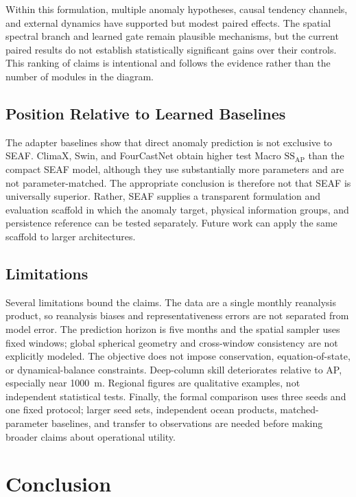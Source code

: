 \documentclass[conference]{IEEEtran}
\begin{document}
Within this formulation, multiple anomaly hypotheses, causal tendency channels, and external dynamics have supported but modest paired effects. The spatial spectral branch and learned gate remain plausible mechanisms, but the current paired results do not establish statistically significant gains over their controls. This ranking of claims is intentional and follows the evidence rather than the number of modules in the diagram.

\subsection{Position Relative to Learned Baselines}
The adapter baselines show that direct anomaly prediction is not exclusive to SEAF. ClimaX, Swin, and FourCastNet obtain higher test Macro $\mathrm{SS}_{\mathrm{AP}}$ than the compact SEAF model, although they use substantially more parameters and are not parameter-matched. The appropriate conclusion is therefore not that SEAF is universally superior. Rather, SEAF supplies a transparent formulation and evaluation scaffold in which the anomaly target, physical information groups, and persistence reference can be tested separately. Future work can apply the same scaffold to larger architectures.

\subsection{Limitations}
Several limitations bound the claims. The data are a single monthly reanalysis product, so reanalysis biases and representativeness errors are not separated from model error. The prediction horizon is five months and the spatial sampler uses fixed windows; global spherical geometry and cross-window consistency are not explicitly modeled. The objective does not impose conservation, equation-of-state, or dynamical-balance constraints. Deep-column skill deteriorates relative to AP, especially near 1000~m. Regional figures are qualitative examples, not independent statistical tests. Finally, the formal comparison uses three seeds and one fixed protocol; larger seed sets, independent ocean products, matched-parameter baselines, and transfer to observations are needed before making broader claims about operational utility.

\section{Conclusion}
\end{document}

